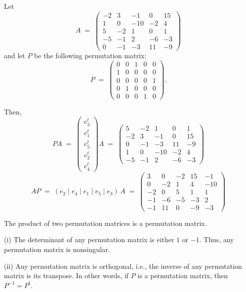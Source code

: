 \begin{examplex}
Let
\[
A \;=\; \begin{pmatrix}
-2 & 3 & -1 & 0 & 15 \\
1 & 0 & -10 & -2 & 4 \\
5 & -2 & 1 & 0 & 1 \\
-5 & -1 & 2 & -6 & -3 \\
0 & -1 & -3 & 11 & -9
\end{pmatrix}
\]
and let $P$ be the following permutation matrix:
\[
P \;=\; \begin{pmatrix}
0 & 0 & 1 & 0 & 0 \\
1 & 0 & 0 & 0 & 0 \\
0 & 0 & 0 & 0 & 1 \\
0 & 1 & 0 & 0 & 0 \\
0 & 0 & 0 & 1 & 0
\end{pmatrix}.
\]

Then,
\[
PA \;=\; \begin{pmatrix} e_3^t \\ e_1^t \\ e_5^t \\ e_2^t \\ e_4^t \end{pmatrix} A
\;=\; \begin{pmatrix}
5 & -2 & 1 & 0 & 1 \\
-2 & 3 & -1 & 0 & 15 \\
0 & -1 & -3 & 11 & -9 \\
1 & 0 & -10 & -2 & 4 \\
-5 & -1 & 2 & -6 & -3
\end{pmatrix}
\]
\[
AP \;=\; (e_2 \mid e_4 \mid e_1 \mid e_5 \mid e_3)\, A \;=\; \begin{pmatrix}
3 & 0 & -2 & 15 & -1 \\
0 & -2 & 1 & 4 & -10 \\
-2 & 0 & 5 & 1 & 1 \\
-1 & -6 & -5 & -3 & 2 \\
-1 & 11 & 0 & -9 & -3
\end{pmatrix}
\]
\end{examplex}

\begin{lemma}
The product of two permutation matrices is a permutation matrix.
\end{lemma}

\begin{lemma}
(i) The determinant of any permutation matrix is either $1$ or $-1$. Thus, any
permutation matrix is nonsingular.

(ii) Any permutation matrix is orthogonal, i.e., the inverse of any permutation
matrix is its transpose. In other words, if $P$ is a permutation matrix, then
$P^{-1} = P^t$.
\end{lemma}

